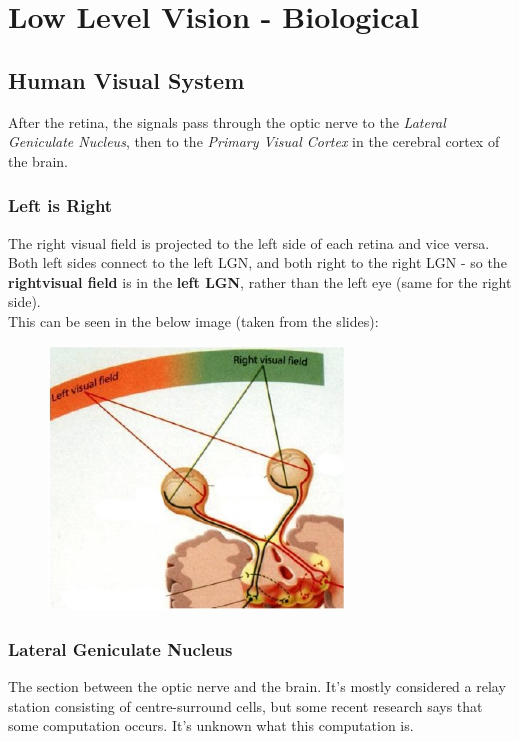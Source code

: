 \section{Low Level Vision - Biological}

\subsection{Human Visual System}
After the retina, the signals pass through the optic nerve to the \emph{Lateral Geniculate Nucleus}, then to the \emph{Primary Visual Cortex} in the cerebral cortex of the brain.

\subsubsection{Left is Right}
The right visual field is projected to the left side of each retina and vice versa. Both left sides connect to the left LGN, and both right to the right LGN - so the \textbf{rightvisual field} is in the \textbf{left LGN}, rather than the left eye (same for the right side). \\
This can be seen in the below image (taken from the slides): \\

\begin{figure}[H]
    \centering
    \includegraphics[width = \textwidth, height=7cm,keepaspectratio ]{Images/Visual_Field_to_LGN}
\end{figure}

\subsubsection{Lateral Geniculate Nucleus}
The section between the optic nerve and the brain. It's mostly considered a relay station consisting of centre-surround cells, but some recent research says that some computation occurs. It's unknown what this computation is. 


